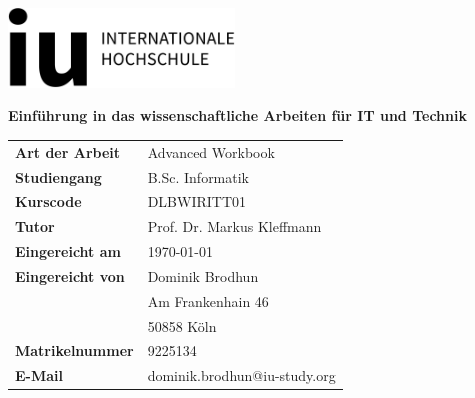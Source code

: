 \begin{titlepage}
	\thispagestyle{empty}

	\begin{flushright}
		\includegraphics[width=6cm]{logo.jpg}
	\end{flushright}

	\vfill

	\begin{center}
		{\huge\bfseries Einführung in das wissenschaftliche Arbeiten für IT und Technik\par}
	\end{center}

	\vfill

	\begin{tabular}{@{}l l}
		\textbf{Art der Arbeit}  & Advanced Workbook            \\
		\textbf{Studiengang}     & B.Sc. Informatik             \\
		\textbf{Kurscode}        & DLBWIRITT01                  \\
		\textbf{Tutor}           & Prof. Dr. Markus Kleffmann   \\[1em]
		\textbf{Eingereicht am}  & \today                       \\[1em]
		\textbf{Eingereicht von} & Dominik Brodhun              \\
		                         & Am Frankenhain 46            \\
		                         & 50858 Köln                   \\[0.5em]
		\textbf{Matrikelnummer}  & 9225134                      \\
		\textbf{E-Mail}          & dominik.brodhun@iu-study.org \\
	\end{tabular}
\end{titlepage}
